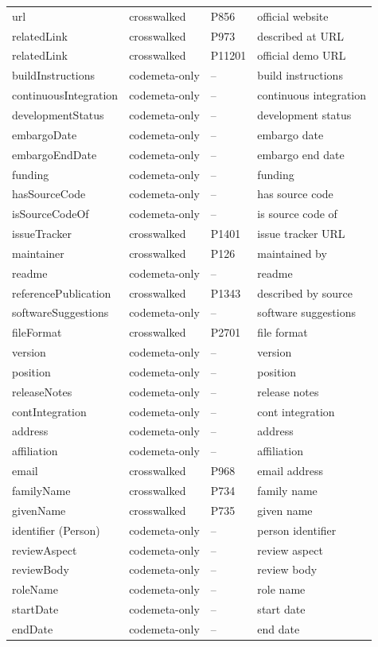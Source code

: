 \begin{longtable}{llll}
url & crosswalked & P856 & official website \\
relatedLink & crosswalked & P973 & described at URL \\
relatedLink & crosswalked & P11201 & official demo URL \\
buildInstructions & codemeta-only & -- & build instructions \\
continuousIntegration & codemeta-only & -- & continuous integration \\
developmentStatus & codemeta-only & -- & development status \\
embargoDate & codemeta-only & -- & embargo date \\
embargoEndDate & codemeta-only & -- & embargo end date \\
funding & codemeta-only & -- & funding \\
hasSourceCode & codemeta-only & -- & has source code \\
isSourceCodeOf & codemeta-only & -- & is source code of \\
issueTracker & crosswalked & P1401 & issue tracker URL \\
maintainer & crosswalked & P126 & maintained by \\
readme & codemeta-only & -- & readme \\
referencePublication & crosswalked & P1343 & described by source \\
softwareSuggestions & codemeta-only & -- & software suggestions \\
fileFormat & crosswalked & P2701 & file format \\
version & codemeta-only & -- & version \\
position & codemeta-only & -- & position \\
releaseNotes & codemeta-only & -- & release notes \\
contIntegration & codemeta-only & -- & cont integration \\
address & codemeta-only & -- & address \\
affiliation & codemeta-only & -- & affiliation \\
email & crosswalked & P968 & email address \\
familyName & crosswalked & P734 & family name \\
givenName & crosswalked & P735 & given name \\
identifier (Person) & codemeta-only & -- & person identifier \\
reviewAspect & codemeta-only & -- & review aspect \\
reviewBody & codemeta-only & -- & review body \\
roleName & codemeta-only & -- & role name \\
startDate & codemeta-only & -- & start date \\
endDate & codemeta-only & -- & end date \\
\hline
\end{longtable}
